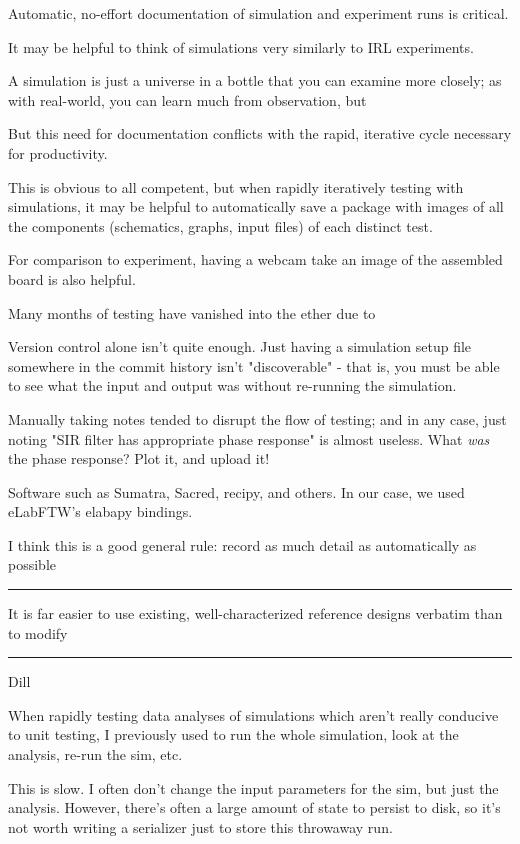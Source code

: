 \documentclass[paper.tex]{subfiles}
\begin{document}
Automatic, no-effort documentation of simulation and experiment runs is critical.

It may be helpful to think of simulations very similarly to IRL experiments. 

A simulation is just a universe in a bottle that you can examine more closely; as with real-world, you can learn much from observation, but 

But this need for documentation conflicts with the rapid, iterative cycle necessary for productivity.

This is obvious to all competent, but when rapidly iteratively testing with simulations, it may be helpful to automatically save a package with images of all the components (schematics, graphs, input files) of each distinct test. 

For comparison to experiment, having a webcam take an image of the assembled board is also helpful. 

Many months of testing have vanished into the ether due to 

Version control alone isn't quite enough. Just having a simulation setup file somewhere in the commit history isn't "discoverable" - that is, you must be able to see what the input and output was without re-running the simulation. 

Manually taking notes tended to disrupt the flow of testing; and in any case, just noting "SIR filter has appropriate phase response" is almost useless. What {\it was} the phase response? Plot it, and upload it!

Software such as Sumatra, Sacred, recipy, and others. In our case, we used eLabFTW's elabapy bindings.

I think this is a good general rule: record as much detail as automatically as possible

\rule{\linewidth}{0.2pt}

It is far easier to use existing, well-characterized reference designs verbatim than to modify 

\rule{\linewidth}{0.2pt}

Dill

When rapidly testing data analyses of simulations which aren't really conducive to unit testing, I previously used to run the whole simulation, look at the analysis, re-run the sim, etc.

This is slow. I often don't change the input parameters for the sim, but just the analysis. However, there's often a large amount of state to persist to disk, so it's not worth writing a serializer just to store this throwaway run.
\end{document}

